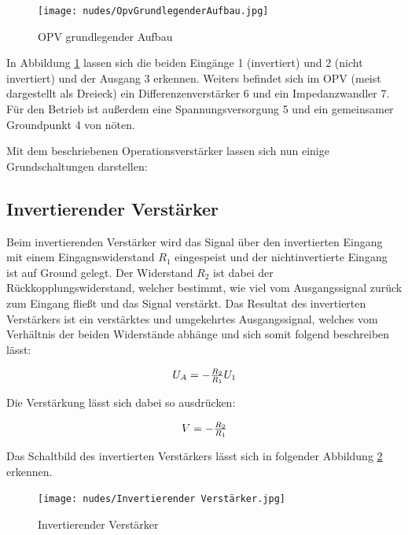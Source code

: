 \documentclass[12pt,a4paper,twoside]{article}
\begin{document}
\begin{figure}[H]
    \centering
    \texttt{[image: nudes/OpvGrundlegenderAufbau.jpg]}
    \caption{OPV grundlegender Aufbau \cite{teachcenter2}}
    \label{fig:OpvAufbau}
\end{figure}

\noindent
In Abbildung \ref{fig:OpvAufbau} lassen sich die beiden Eingänge 1 (invertiert) und 2 (nicht invertiert) und der Ausgang 3 erkennen. Weiters befindet sich im OPV (meist dargestellt als Dreieck) ein Differenzenverstärker 6 und ein Impedanzwandler 7. Für den Betrieb ist außerdem eine Spannungsversorgung 5 und ein gemeinsamer Groundpunkt 4 von nöten. \newline

\noindent
Mit dem beschriebenen Operationsverstärker lassen sich nun einige Grundschaltungen darstellen:

\subsection{Invertierender Verstärker}

Beim invertierenden Verstärker wird das Signal über den invertierten Eingang mit einem Eingagnswiderstand $R_{1}$ eingespeist und der nichtinvertierte Eingang ist auf Ground gelegt. Der Widerstand $R_{2}$ ist dabei der Rückkopplungswiderstand, welcher bestimmt, wie viel vom Ausgangssignal zurück zum Eingang fließt und das Signal verstärkt.
Das Resultat des invertierten Verstärkers ist ein verstärktes und umgekehrtes Ausgangssignal, welches vom Verhältnis der beiden Widerstände abhänge und sich somit folgend beschreiben lässt:

\begin{equation}
    \label{eq:InvertierenderVerstärkerAusgang}
    \centerline{$U_{A}=-\frac{R_{2}}{R_{1}}U_{1}$}
\end{equation}

\noindent
Die Verstärkung lässt sich dabei so ausdrücken:

\begin{equation}
    \label{eq:InvertierenderVerstärkerVerstärkung}
    \centerline{$V=-\frac{R_{2}}{R_{1}}$}
\end{equation}

\noindent
Das Schaltbild des invertierten Verstärkers lässt sich in folgender Abbildung \ref{fig:InvertierenderVerstärker} erkennen.

\begin{figure}[H]
    \centering
    \texttt{[image: nudes/Invertierender Verstärker.jpg]}
    \caption{Invertierender Verstärker \cite{teachcenter2}}
    \label{fig:InvertierenderVerstärker}
\end{figure}
\end{document}
